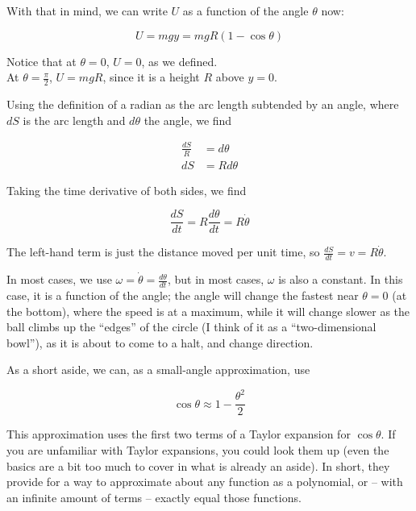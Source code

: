 \documentclass[12pt,a4paper]{report}
\begin{document}
With that in mind, we can write $U$ as a function of the angle $\theta$ now:

\begin{equation}
U = m g y = m g R (1 - \cos \theta)
\end{equation}

Notice that at $\theta = 0$, $U = 0$, as we defined.\\
At $\displaystyle \theta = \frac{\pi}{2}$, $U = m g R$, since it is a height $R$ above $y = 0$.

Using the definition of a radian as the arc length subtended by an angle, where $dS$ is the arc length and $d\theta$ the angle, we find

\begin{align}
\frac{dS}{R} &= d\theta\\
dS &= R d\theta
\end{align}

Taking the time derivative of both sides, we find

\begin{equation}
\frac{dS}{dt} = R \frac{d\theta}{dt} = R \dot{\theta}
\end{equation}

The left-hand term is just the distance moved per unit time, so $\displaystyle \frac{dS}{dt} = v = R \dot{\theta}$.

In most cases, we use $\displaystyle \omega = \dot{\theta} = \frac{d\theta}{dt}$, but in most cases, $\omega$ is also a constant. In this case, it is a function of the angle; the angle will change the fastest near $\theta = 0$ (at the bottom), where the speed is at a maximum, while it will change slower as the ball climbs up the ``edges'' of the circle (I think of it as a ``two-dimensional bowl''), as it is about to come to a halt, and change direction.

As a short aside, we can, as a small-angle approximation, use

\begin{equation}
\cos \theta \approx 1 - \frac{\theta^2}{2}
\end{equation}

This approximation uses the first two terms of a Taylor expansion for $\cos \theta$. If you are unfamiliar with Taylor expansions, you could look them up (even the basics are a bit too much to cover in what is already an aside). In short, they provide for a way to approximate about any function as a polynomial, or -- with an infinite amount of terms -- exactly equal those functions.
\end{document}
